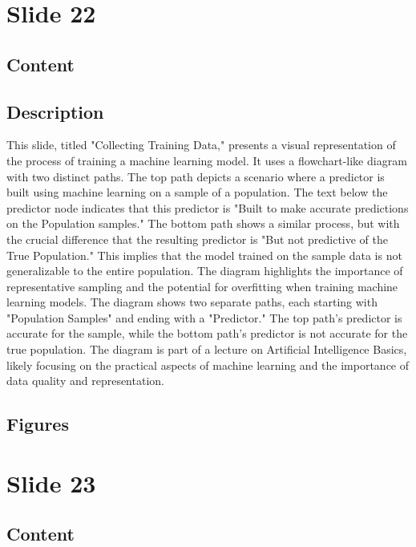 \documentclass{article}%
\begin{document}
%
\newpage%
\section{Slide 22}%
\label{sec:Slide22}%
\subsection{Content}%
%
\subsection{Description}%
This slide, titled "Collecting Training Data," presents a visual representation of the process of training a machine learning model.  It uses a flowchart-like diagram with two distinct paths.  The top path depicts a scenario where a predictor is built using machine learning on a sample of a population.  The text below the predictor node indicates that this predictor is "Built to make accurate predictions on the Population samples."  The bottom path shows a similar process, but with the crucial difference that the resulting predictor is "But not predictive of the True Population."  This implies that the model trained on the sample data is not generalizable to the entire population.  The diagram highlights the importance of representative sampling and the potential for overfitting when training machine learning models.  The diagram shows two separate paths, each starting with "Population Samples" and ending with a "Predictor."  The top path's predictor is accurate for the sample, while the bottom path's predictor is not accurate for the true population.  The diagram is part of a lecture on Artificial Intelligence Basics, likely focusing on the practical aspects of machine learning and the importance of data quality and representation.%
\subsection{Figures}%
\begin{figure}[H]%
\centering%
\end{figure}

%
\newpage%
\section{Slide 23}%
\label{sec:Slide23}%
\subsection{Content}%
\end{document}
